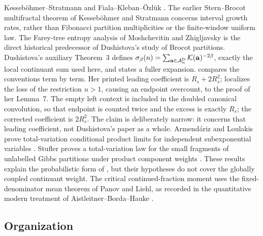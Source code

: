 Kesseb\"ohmer--Stratmann and Fiala--Kleban--\"Ozl\"uk
\cite{KessebohmerStratmann2007,FialaKlebanOzluk2003}.  The earlier
Stern--Brocot multifractal theorem of Kesseb\"ohmer and Stratmann
\cite{KessebohmerStratmann2004} concerns interval growth rates, rather than
Fibonacci partition multiplicities or the finite-window uniform law.
The Farey-tree entropy analysis of Moshchevitin and Zhigljavsky
\cite{MoshchevitinZhigljavsky2004} is the direct historical predecessor of
Dushistova's study of Brocot partitions.  Dushistova's auxiliary Theorem~3
\cite{Dushistova2007} defines
\(\sigma_\beta(n)=\sum_{\mathbf a\in\mathcal A_n^{\rm D}}
\mathcal K(\mathbf a)^{-2\beta}\), exactly the local continuant sum used here,
and states a fuller expansion.  
compares the conventions term by term.  Her printed leading coefficient is
\(R_s+2R_s^2\);  localizes the loss of
the restriction \(u>1\), causing an endpoint overcount, to the proof of her
Lemma~7.  The empty left context is included in the doubled canonical
convolution, so that endpoint is counted twice and the excess is exactly
\(R_s\); the corrected coefficient is \(2R_s^2\).  The claim is deliberately
narrow: it concerns that leading coefficient, not Dushistova's paper as a
whole.
Armend\'ariz and Loulakis prove total-variation conditional product limits
for independent subexponential variables
\cite{ArmendarizLoulakis2011}.  Stufler proves a total-variation law for the
small fragments of unlabelled Gibbs partitions under product component
weights \cite{Stufler2020}.  These results explain the probabilistic form of
, but their hypotheses do not cover the
globally coupled continuant weight.
The critical continued-fraction moment uses the fixed-denominator mean theorem of Panov and
Liehl, as recorded in the quantitative modern treatment of
Aistleitner--Borda--Hauke
\cite{Panov1982,Liehl1983,AistleitnerBordaHauke2023}.

\subsection{Organization}

